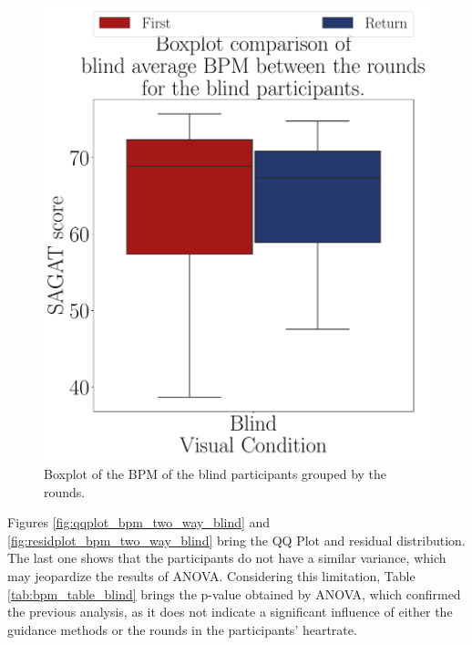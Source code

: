\begin{figure}[!htb]
\begin{minipage}{0.45\textwidth}
        \includegraphics[width = \textwidth]{Resultados/ECG/Figuras/pdf/boxplot_ecg_bpm_blind_rounds.pdf}
        \caption{Boxplot of the BPM of the blind participants grouped by the rounds.}
        \label{fig:boxplot_ecg_bpm_blind_rounds}
    \end{minipage}
\end{figure}

Figures \ref{fig:qqplot_bpm_two_way_blind} and \ref{fig:residplot_bpm_two_way_blind} bring the QQ Plot and residual distribution. The last one shows that the participants do not have a similar variance, which may jeopardize the results of ANOVA. Considering this limitation, Table \ref{tab:bpm_table_blind} brings the p-value obtained by ANOVA, which confirmed the previous analysis, as it does not indicate a significant influence of either the guidance methods or the rounds in the participants' heartrate. 

